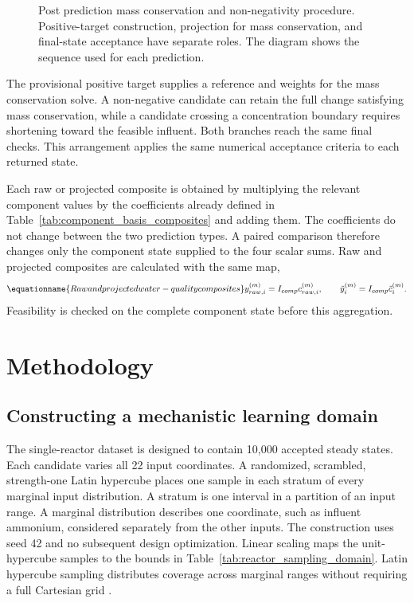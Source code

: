 \begin{figure}[htbp]
\centering

\caption{Post prediction mass conservation and non-negativity procedure. Positive-target construction, projection for mass conservation, and final-state acceptance have separate roles. The diagram shows the sequence used for each prediction.}
\label{fig:projection_acceptance_flow}
\end{figure}

The provisional positive target supplies a reference and weights for the mass conservation solve. A non-negative candidate can retain the full change satisfying mass conservation, while a candidate crossing a concentration boundary requires shortening toward the feasible influent. Both branches reach the same final checks. This arrangement applies the same numerical acceptance criteria to each returned state.

Each raw or projected composite is obtained by multiplying the relevant component values by the coefficients already defined in Table~\ref{tab:component_basis_composites} and adding them. The coefficients do not change between the two prediction types. A paired comparison therefore changes only the component state supplied to the four scalar sums. Raw and projected composites are calculated with the same map,
\begin{equation}
\equationname{Raw and projected water-quality composites}
y_{raw,i}^{(m)}=I_{comp}c_{raw,i}^{(m)},\qquad
\tilde y_i^{(m)}=I_{comp}\tilde c_i^{(m)}.
\label{eq:projection_paired_composites}
\end{equation}
Feasibility is checked on the complete component state before this aggregation.

\section{Methodology}

\subsection{Constructing a mechanistic learning domain}

The single-reactor dataset is designed to contain 10,000 accepted steady states. Each candidate varies all 22 input coordinates. A randomized, scrambled, strength-one Latin hypercube places one sample in each stratum of every marginal input distribution. A stratum is one interval in a partition of an input range. A marginal distribution describes one coordinate, such as influent ammonium, considered separately from the other inputs. The construction uses seed 42 and no subsequent design optimization. Linear scaling maps the unit-hypercube samples to the bounds in Table~\ref{tab:reactor_sampling_domain}. Latin hypercube sampling distributes coverage across marginal ranges without requiring a full Cartesian grid \citep{McKay1979}.

